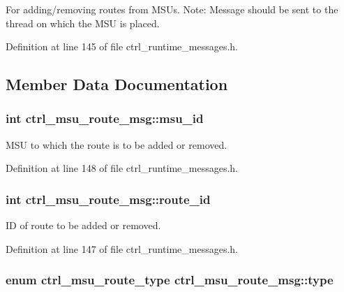 For adding/removing routes from M\-S\-Us. Note\-: Message should be sent to the thread on which the M\-S\-U is placed. 

Definition at line 145 of file ctrl\-\_\-runtime\-\_\-messages.\-h.



\subsection{Member Data Documentation}
\hypertarget{structctrl__msu__route__msg_a4e29c9a68472bf6c53a719e3c4eb20ca}{
\subsubsection[{msu\-\_\-id}]{\setlength{\rightskip}{0pt plus 5cm}int ctrl\-\_\-msu\-\_\-route\-\_\-msg\-::msu\-\_\-id}}\label{structctrl__msu__route__msg_a4e29c9a68472bf6c53a719e3c4eb20ca}


M\-S\-U to which the route is to be added or removed. 



Definition at line 148 of file ctrl\-\_\-runtime\-\_\-messages.\-h.

\hypertarget{structctrl__msu__route__msg_a932e1789c351a3f9fc12686510097b5f}{
\subsubsection[{route\-\_\-id}]{\setlength{\rightskip}{0pt plus 5cm}int ctrl\-\_\-msu\-\_\-route\-\_\-msg\-::route\-\_\-id}}\label{structctrl__msu__route__msg_a932e1789c351a3f9fc12686510097b5f}


I\-D of route to be added or removed. 



Definition at line 147 of file ctrl\-\_\-runtime\-\_\-messages.\-h.

\hypertarget{structctrl__msu__route__msg_aab44678aabd93699f6fc6c3ac4342761}{
\subsubsection[{type}]{\setlength{\rightskip}{0pt plus 5cm}enum {\bf ctrl\-\_\-msu\-\_\-route\-\_\-type} ctrl\-\_\-msu\-\_\-route\-\_\-msg\-::type}}\label{structctrl__msu__route__msg_aab44678aabd93699f6fc6c3ac4342761}


